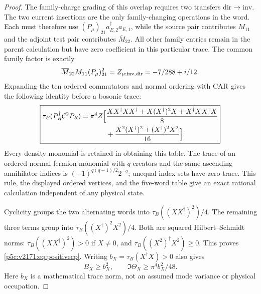 \documentclass[12pt,a4paper]{article}
\begin{document}
\begin{proof}
The family-charge grading of this overlap requires two transfers
$\mathrm{dir}\to\mathrm{inv}$. The two current insertions are the only
family-changing operations in the word. Each must therefore use
$(P_\mu)_{21}a_{E,2}^\dagger a_{E,1}$, while the source pair contributes
$M_{11}$ and the adjoint test pair contributes $\overline M_{22}$.
All other family entries remain in the parent calculation but have zero
coefficient in this particular trace. The common family factor is exactly
\[
 \overline M_{22}M_{11}(P_\mu)_{21}^2
   =Z_{\mu;\rm inv,dir}=-7/288+i/12.
\]
Expanding the ten ordered commutators and normal ordering with CAR gives
the following identity before a bosonic trace:
\begin{equation}
 \boxed{\begin{aligned}
 \tau_F(P_R^\dagger\mathcal C^2P_R)
 =\pi^4Z\Bigl[&\frac{
  XX^\dagger XX^\dagger+X(X^\dagger)^2X+X^\dagger XX^\dagger X}{8}\\
 &+\frac{X^2(X^\dagger)^2+(X^\dagger)^2X^2}{16}\Bigr].
 \end{aligned}}
 \label{p5c:v2171:eq:freewordtable}
\end{equation}
Every density monomial is retained in obtaining this table. The trace of
an ordered normal fermion monomial with $q$ creators and the same ascending
annihilator indices is $(-1)^{q(q-1)/2}2^{-q}$; unequal index sets have
zero trace. This rule, the displayed ordered vertices, and the five-word
table give an exact rational calculation independent of any physical state.

Cyclicity groups the two alternating words into
$\tau_B((XX^\dagger)^2)/4$. The remaining three terms group into
$\tau_B((X^\dagger)^2X^2)/4$.
Both are squared Hilbert--Schmidt norms:
$\tau_B((XX^\dagger)^2)>0$ if $X\ne0$, and
$\tau_B((X^2)^\dagger X^2)\ge0$.
This proves \eqref{p5c:v2171:eq:positivecp}. Writing
$b_X=\tau_B(X^\dagger X)>0$ also gives
\[
 B_X\ge b_X^2,\qquad \Im\Theta_X\ge\pi^4b_X^2/48.
\]
Here $b_X$ is a mathematical trace norm, not an assumed mode variance or
physical occupation.
\end{proof}
\end{document}
